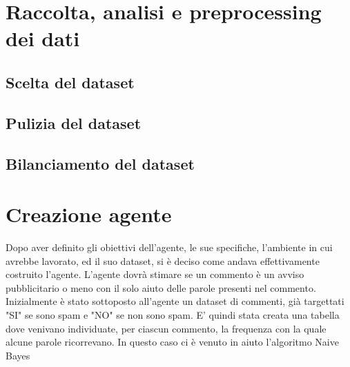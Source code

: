 \documentclass{report} %
\begin{document}
    

                        


   
    \chapter{Raccolta, analisi e preprocessing dei dati}
    \section{Scelta del dataset}
    \section{Pulizia del dataset}
    \section{Bilanciamento del dataset}
    \chapter{Creazione agente}
    Dopo aver definito gli obiettivi dell'agente, le sue specifiche, l'ambiente in cui avrebbe lavorato, ed il suo dataset, si è deciso come andava effettivamente costruito l'agente.
    L'agente dovrà stimare se un commento è un avviso pubblicitario o meno con il solo aiuto delle parole presenti nel commento. Inizialmente è stato sottoposto all'agente 
    un dataset di commenti, già targettati "SI" se sono spam e "NO" se non sono spam. E' quindi stata creata una tabella dove venivano individuate, per ciascun commento,
    la frequenza con la quale alcune parole ricorrevano. In questo caso ci è venuto in aiuto l'algoritmo Naive Bayes
\end{document}
